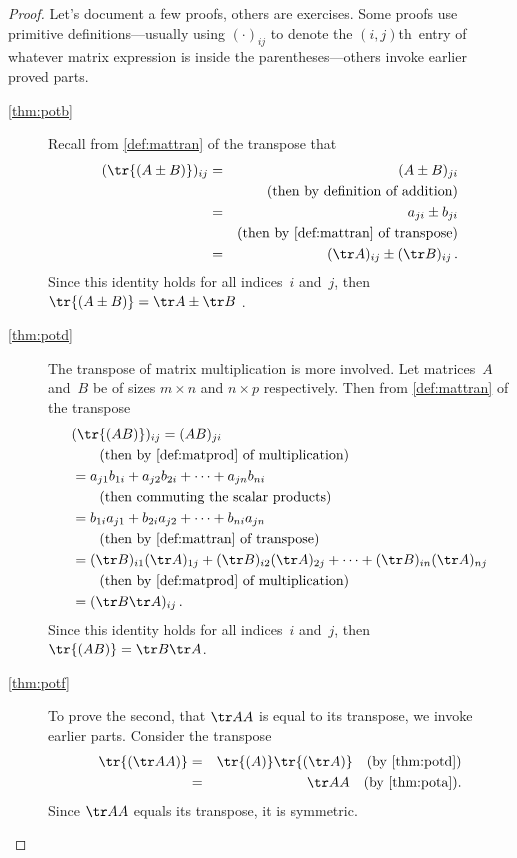 \begin{proof} 
Let's document a few proofs, others are exercises.
Some proofs use primitive definitions---usually using \((\cdot)_{ij}\) to denote the \((i,j)\)th~entry of whatever matrix expression is inside the parentheses---others invoke earlier proved parts.
\begin{description}
\item[\ref{thm:potb}]
Recall from \autoref{def:mattran} of the transpose that
\begin{eqnarray*}
(\tr{(A\pm B)})_{ij}
&=&(A\pm B)_{ji}
\\&&(\text{then by definition of addition})
\\&=&a_{ji}\pm b_{ji}
\\&&(\text{then by \autoref{def:mattran} of transpose})
\\&=&(\tr A)_{ij}\pm(\tr B)_{ij}\,.
\end{eqnarray*}
Since this identity holds for all indices~\(i\) and~\(j\), then \(\tr{(A\pm B)}=\tr A\pm \tr B\) .

\item[\ref{thm:potd}]
The transpose of matrix multiplication is more involved.
Let matrices~\(A\) and~\(B\) be of sizes \(m\times n\) and \(n\times p\) respectively.  Then from \autoref{def:mattran} of the transpose
\begin{align*}
&(\tr{(AB)})_{ij}=(AB)_{ji}
\\&\qquad(\text{then by \autoref{def:matprod} of multiplication})
\\&=a_{j1}b_{1i}+a_{j2}b_{2i}+\cdots+a_{jn}b_{ni}
\\&\qquad(\text{then commuting the scalar products})
\\&=b_{1i}a_{j1}+b_{2i}a_{j2}+\cdots+b_{ni}a_{jn}
\\&\qquad(\text{then by \autoref{def:mattran} of  transpose})
\\&=(\tr B)_{i1}(\tr A)_{1j}+(\tr B)_{i2}(\tr A)_{2j}+\cdots+(\tr B)_{in}(\tr A)_{nj}
\\&\qquad(\text{then by \autoref{def:matprod} of multiplication})
\\&=(\tr B\tr A)_{ij}\,.
\end{align*}
Since this identity holds for all indices~\(i\) and~\(j\), then \(\tr{(AB)}=\tr B\tr A\).

\item[\ref{thm:potf}] To prove the second, that \(\tr AA\) is equal to its transpose, we invoke earlier parts.
Consider the transpose 
\begin{eqnarray*}
\tr{(\tr AA)}&=& \tr{(A)}\tr{(\tr A)}\quad(\text{by~\autoref{thm:potd}})
\\&=&\tr AA\quad(\text{by~\autoref{thm:pota}}).
\end{eqnarray*}
Since \(\tr AA\) equals its transpose, it is symmetric.
\end{description}
\end{proof}








